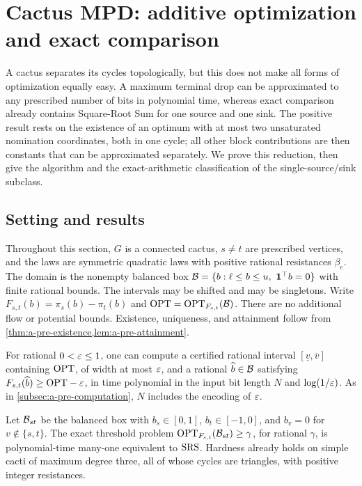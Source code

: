 \section{Cactus MPD: additive optimization and exact comparison}
\label{sec:a-cactus}

A cactus separates its cycles topologically, but this does not make all
forms of optimization equally easy. A maximum terminal drop can be
approximated to any prescribed number of bits in polynomial time,
whereas exact comparison already contains Square-Root Sum for one source
and one sink. The positive result rests on the existence of an optimum
with at most two unsaturated nomination coordinates, both in one cycle;
all other block contributions are then constants that can be
approximated separately. We prove this reduction, then give the
algorithm and the exact-arithmetic classification of the
single-source/sink subclass.

\subsection{Setting and results}
\label{subsec:a-cac-setting}
Throughout this section, $G$ is a connected cactus, $s\ne t$ are
prescribed vertices, and the laws are symmetric quadratic laws with
positive rational resistances $\beta_e$. The domain is the nonempty
balanced box $\mathcal{B}=\{b:\ell\le b\le u,\ \mathbf{1}^\top b=0\}$ with finite
rational bounds. The intervals may be shifted and may be singletons.
Write $F_{s,t}(b)=\pi_s(b)-\pi_t(b)$ and
$\mathrm{OPT}=\mathrm{OPT}_{F_{s,t}}(\mathcal{B})$. There are no additional flow or potential
bounds. Existence, uniqueness, and attainment follow from
\cref{thm:a-pre-existence,lem:a-pre-attainment}.

\begin{theorem}
\label{thm:a-cac-additive}
For rational $0<\varepsilon\le1$, one can compute a certified rational interval
$[\underline v,\overline v]$ containing $\mathrm{OPT}$, of width at most $\varepsilon$,
and a rational $\widehat b\in\mathcal{B}$ satisfying
$F_{s,t}(\widehat b)\ge\mathrm{OPT}-\varepsilon$, in time polynomial in the input bit
length $N$ and $\log(1/\varepsilon)$. As in
\cref{subsec:a-pre-computation}, $N$ includes the encoding of $\varepsilon$.
\end{theorem}

\begin{theorem}
\label{thm:a-cac-srs}
Let $\mathcal{B}_{st}$ be the balanced box with $b_s\in[0,1]$,
$b_t\in[-1,0]$, and $b_v=0$ for $v\notin\{s,t\}$. The exact
threshold problem $\mathrm{OPT}_{F_{s,t}}(\mathcal{B}_{st})\ge\gamma$, for rational
$\gamma$, is polynomial-time many-one equivalent to $\mathrm{SRS}$.
Hardness already holds on simple cacti of maximum degree three, all of
whose cycles are triangles, with positive integer resistances.
\end{theorem}

